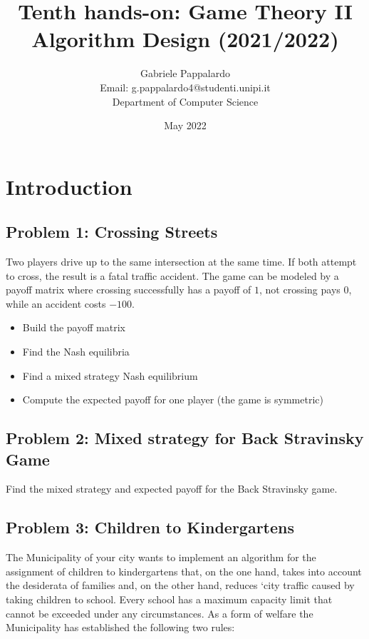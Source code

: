 \documentclass{article}
\title{Tenth hands-on: Game Theory II\\[1ex] \large Algorithm Design (2021/2022)}
\author{Gabriele Pappalardo\\Email: g.pappalardo4@studenti.unipi.it\\Department of Computer Science}
\date{May 2022}
\begin{document}
\maketitle

\section{Introduction}

\subsection[]{Problem 1: Crossing Streets}

Two players drive up to the same intersection at the same time. If both attempt to cross, the result is a fatal traffic accident. 
The game can be modeled by a payoff matrix where crossing successfully has a payoff of $1$, not crossing pays $0$, while an accident costs $−100$.

\begin{itemize}
    \item Build the payoff matrix 
    \item Find the Nash equilibria 
    \item Find a mixed strategy Nash equilibrium 
    \item Compute the expected payoff for one player (the game is symmetric) 
\end{itemize}

\subsection[]{Problem 2: Mixed strategy for Back Stravinsky Game}

Find the mixed strategy and expected payoff for the Back Stravinsky game.

\subsection[]{Problem 3: Children to Kindergartens}

The Municipality of your city wants to implement an algorithm for the assignment of children to kindergartens that, on the one hand, takes into account 
the desiderata of families and, on the other hand, reduces `city traffic caused by taking children to school. 
Every school has a maximum capacity limit that cannot be exceeded under any circumstances.
As a form of welfare the Municipality has established the following two rules:  
\end{document}
